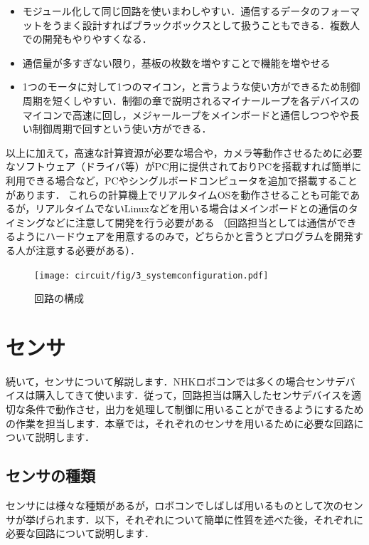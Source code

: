 \begin{itemize}
    \item モジュール化して同じ回路を使いまわしやすい．通信するデータのフォーマットをうまく設計すればブラックボックスとして扱うこともできる．複数人での開発もやりやすくなる．
    \item 通信量が多すぎない限り，基板の枚数を増やすことで機能を増やせる
    \item 1つのモータに対して1つのマイコン，と言うような使い方ができるため制御周期を短くしやすい．制御の章で説明されるマイナーループを各デバイスのマイコンで高速に回し，メジャーループをメインボードと通信しつつやや長い制御周期で回すという使い方ができる．
\end{itemize}

以上に加えて，高速な計算資源が必要な場合や，カメラ等動作させるために必要なソフトウェア（ドライバ等）がPC用に提供されておりPCを搭載すれば簡単に利用できる場合など，PCやシングルボードコンピュータを追加で搭載することがあります．
これらの計算機上でリアルタイムOSを動作させることも可能であるが，リアルタイムでないLinuxなどを用いる場合はメインボードとの通信のタイミングなどに注意して開発を行う必要がある
（回路担当としては通信ができるようにハードウェアを用意するのみで，どちらかと言うとプログラムを開発する人が注意する必要がある）．


\begin{figure}[h]
  \centering
  \texttt{[image: circuit/fig/3\_systemconfiguration.pdf]}
  \caption{回路の構成}
  \label{fig:circuit_system_configuration}
\end{figure}

\section{センサ}

続いて，センサについて解説します．NHKロボコンでは多くの場合センサデバイスは購入してきて使います．従って，回路担当は購入したセンサデバイスを適切な条件で動作させ，出力を処理して制御に用いることができるようにするための作業を担当します．本章では，それぞれのセンサを用いるために必要な回路について説明します．

\subsection{センサの種類}

センサには様々な種類があるが，ロボコンでしばしば用いるものとして次のセンサが挙げられます．以下，それぞれについて簡単に性質を述べた後，それぞれに必要な回路について説明します．

